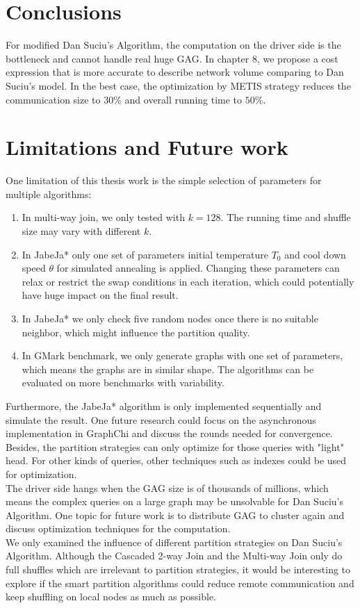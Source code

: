 \section{Conclusions}
For modified Dan Suciu's Algorithm, the computation on the driver side is the bottleneck and cannot handle real huge GAG. In chapter 8, we propose a cost expression that is more accurate to describe network volume comparing to Dan Suciu's model. In the best case, the optimization by METIS strategy reduces the communication size to $30\%$ and overall running time to $50\%$.

\section{Limitations and Future work}
One limitation of this thesis work is the simple selection of parameters for multiple algorithms:
\begin{enumerate}
    \item In multi-way join, we only tested with $k=128$. The running time and shuffle size may vary with different $k$.
    \item In JabeJa* only one set of parameters initial temperature $T_0$ and cool down speed $\theta$ for simulated annealing is applied. Changing these parameters can relax or restrict the swap conditions in each iteration, which could potentially have huge impact on the final result.
    \item In JabeJa* we only check five random nodes once there is no suitable neighbor, which might influence the partition quality.
    \item In GMark benchmark, we only generate graphs with one set of parameters, which means the graphs are in similar shape. The algorithms can be evaluated on more benchmarks with variability.
\end{enumerate}
Furthermore, the JabeJa* algorithm is only implemented sequentially and simulate the result. One future research could focus on the asynchronous implementation in GraphChi and discuss the rounds needed for convergence.
\\Besides, the partition strategies can only optimize for those queries with "light" head. For other kinds of queries, other techniques such as indexes could be used for optimization.
\\The driver side hangs when the GAG size is of thousands of millions, which means the complex queries on a large graph may be unsolvable for Dan Suciu's Algorithm. One topic for future work is to distribute GAG to cluster again and discuss optimization techniques for the computation.
\\We only examined the influence of different partition strategies on Dan Suciu's Algorithm. Although the Cascaded 2-way Join and the Multi-way Join only do full shuffles which are irrelevant to partition strategies, it would be interesting to explore if the smart partition algorithms could reduce remote communication and keep shuffling on local nodes as much as possible.